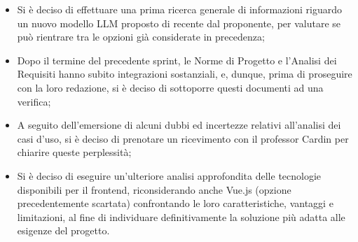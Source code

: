 \begin{itemize}
    \item Si è deciso di effettuare una prima ricerca generale di informazioni riguardo un nuovo modello LLM proposto di recente dal proponente, per valutare se può rientrare tra le opzioni già considerate in precedenza;
    \item Dopo il termine del precedente sprint, le Norme di Progetto e l'Analisi dei Requisiti hanno subito integrazioni sostanziali, e, dunque, prima di proseguire con la loro redazione, si è deciso di sottoporre questi documenti ad una verifica;
    \item A seguito dell'emersione di alcuni dubbi ed incertezze relativi all'analisi dei casi d'uso, si è deciso di prenotare un ricevimento con il professor Cardin per chiarire queste perplessità;
    \item Si è deciso di eseguire un'ulteriore analisi approfondita delle tecnologie disponibili per il frontend, riconsiderando anche Vue.js (opzione precedentemente scartata) confrontando le loro caratteristiche, vantaggi e limitazioni, al fine di individuare definitivamente la soluzione più adatta alle esigenze del progetto.
\end{itemize}
